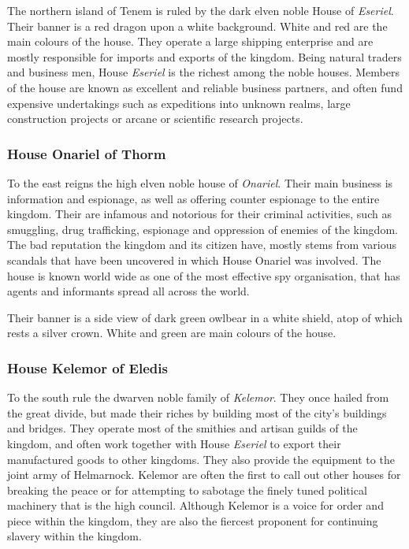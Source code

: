 The northern island of Tenem is ruled by the dark elven noble House of
\emph{Eseriel}. Their banner is a red dragon upon a white background. White
and red are the main colours of the house. They operate a large shipping
enterprise and are mostly responsible for imports and exports of the
kingdom. Being natural traders and business men, House \emph{Eseriel} is the
richest among the noble houses. Members of the house are known as excellent
and reliable business partners, and often fund expensive undertakings such
as expeditions into unknown realms, large construction projects or arcane
or scientific research projects.

\subsubsection{House Onariel of Thorm}
\label{sec:House Onariel}

To the east reigns the high elven noble house of \emph{Onariel}. Their main
business is information and espionage, as well as offering counter espionage
to the entire kingdom. Their are infamous and notorious for their criminal
activities, such as smuggling, drug trafficking, espionage and oppression
of enemies of the kingdom. The bad reputation the kingdom and its citizen
have, mostly stems from various scandals that have been uncovered in which
House Onariel was involved. The house is known world wide as one of the most
effective spy organisation, that has agents and informants spread all across
the world.

Their banner is a side view of dark green owlbear in a white shield, atop of
which rests a silver crown. White and green are main colours of the house.

\subsubsection{House Kelemor of Eledis}
\label{sec:House Kelemor}

To the south rule the dwarven noble family of \emph{Kelemor}. They once
hailed from the great divide, but made their riches by building most of
the city's buildings and bridges. They operate most of the smithies and
artisan guilds of the kingdom, and often work together with House
\emph{Eseriel} to export their manufactured goods to other kingdoms.
They also provide the equipment to the joint army of Helmarnock. Kelemor
are often the first to call out other houses for breaking the peace or
for attempting to sabotage the finely tuned political machinery that
is the high council. Although Kelemor is a voice for order and piece within
the kingdom, they are also the fiercest proponent for continuing slavery
within the kingdom.

